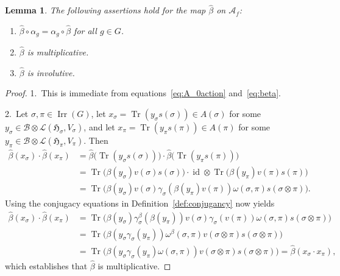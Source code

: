 \documentclass[10pt,a4paper]{amsart}
\numberwithin{equation}{section}
\newtheorem{Lemma}[Theorem]{Lemma}
\newcommand*{\tensor}{\otimes}		%
\DeclareMathOperator{\id}{id}		%
\DeclareMathOperator{\Tr}{Tr}		%
\newcommand*{\hilb}{\mathfrak}		%
\newcommand*{\alg}{\mathcal}		%
\newcommand*{\hH}{\hilb{H}}			%
\newcommand*{\aA}{\alg{A}}			%
\newcommand*{\aB}{\alg{B}} 			%
\newcommand*{\End}{\mathcal{L}} %
\DeclareMathOperator{\Irrep}{Irr} 			%
\begin{document}
\begin{Lemma}\label{lem:prop_beta}
	The following assertions hold for the map $\hat \beta$ on $\aA_f$:
	\begin{enumerate}\itemsep=0pt
	\item[$1.$]
		$\hat\beta \circ \alpha_g = \alpha_g \circ \hat \beta$ for all $g \in G$.
	\item[$2.$]
		$\hat\beta$ is multiplicative.
	\item[$3.$]
		$\hat\beta$ is involutive.
	\end{enumerate}
\end{Lemma}
\begin{proof}1.~This is immediate from equations~\eqref{eq:A_0action} and~\eqref{eq:beta}.

2.~Let $\sigma, \pi \in \Irrep(G)$, let $x_\sigma = \Tr (y_\sigma s(\sigma)) \in A(\sigma)$ for some $y_\sigma \in \aB \tensor \End(\hH_\sigma, V_\sigma)$, and let $x_\pi = \Tr ( y_\pi s(\pi) ) \in A(\pi)$ for some $y_\pi \in \aB \tensor \End(\hH_\pi, V_\pi)$.
		Then
		\begin{align*}
			\hat\beta(x_\sigma) \cdot \hat\beta(x_\pi)
			&=
			\hat\beta \bigl( \Tr( y_\sigma s(\sigma) ) \bigr)
			\cdot \hat \beta \bigl( \Tr (y_\pi s(\pi) ) \bigr)
			\\
			&=
			\Tr \bigl( \beta(y_\sigma) v(\sigma) s(\sigma) \bigr)
			\cdot \id \tensor \Tr \bigl( \beta(y_\pi) v(\pi) s(\pi) \bigr)
			\\
			&=
			\Tr \bigl( \beta(y_\sigma) v(\sigma) \gamma_\sigma ( \beta(y_\pi) v(\pi) ) \omega(\sigma, \pi) s(\sigma \tensor \pi) \bigr).
		\end{align*}
		Using the conjugacy equations in Definition~\ref{def:conjugancy} now yields
		\begin{align*}
			\hat\beta(x_\sigma) \cdot \hat\beta(x_\pi)
			&=
			\Tr \bigl( \beta(y_\sigma) \gamma^\beta_\sigma ( \beta(y_\pi) ) v(\sigma) \gamma_\sigma ( v(\pi) ) \omega(\sigma, \pi) s(\sigma \tensor \pi) \bigr)
			\\
			&= \Tr \bigl( \beta ( y_\sigma \gamma_\sigma(y_\pi) ) \omega^\beta(\sigma, \pi) v(\sigma \tensor \pi) s(\sigma \tensor \pi) \bigr)
			\\
			&= \Tr \bigl( \beta ( y_\sigma \gamma_\sigma(y_\pi) \omega(\sigma, \pi) ) v(\sigma \tensor \pi) s(\sigma \tensor \pi) \bigr)
			=
			\hat\beta(x_\sigma \cdot x_\pi),
		\end{align*}
		which establishes that $\hat\beta$ is multiplicative.


\end{proof}
\end{document}
